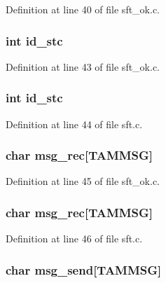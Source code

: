 Definition at line 40 of file sft\_\-ok.c.

\hypertarget{group__tools_gad4a4ca83bbe60e2e30bcb135a16d4ae0}{
\subsubsection[{id\_\-stc}]{\setlength{\rightskip}{0pt plus 5cm}int {\bf id\_\-stc}}}
\label{group__tools_gad4a4ca83bbe60e2e30bcb135a16d4ae0}


Definition at line 43 of file sft\_\-ok.c.

\hypertarget{group__tools_gad4a4ca83bbe60e2e30bcb135a16d4ae0}{
\subsubsection[{id\_\-stc}]{\setlength{\rightskip}{0pt plus 5cm}int {\bf id\_\-stc}}}
\label{group__tools_gad4a4ca83bbe60e2e30bcb135a16d4ae0}


Definition at line 44 of file sft.c.

\hypertarget{group__tools_gaee111dc44c3bce736f7f414e0641a022}{
\subsubsection[{msg\_\-rec}]{\setlength{\rightskip}{0pt plus 5cm}char {\bf msg\_\-rec}\mbox{[}TAMMSG\mbox{]}}}
\label{group__tools_gaee111dc44c3bce736f7f414e0641a022}


Definition at line 45 of file sft\_\-ok.c.

\hypertarget{group__tools_gaee111dc44c3bce736f7f414e0641a022}{
\subsubsection[{msg\_\-rec}]{\setlength{\rightskip}{0pt plus 5cm}char {\bf msg\_\-rec}\mbox{[}TAMMSG\mbox{]}}}
\label{group__tools_gaee111dc44c3bce736f7f414e0641a022}


Definition at line 46 of file sft.c.

\hypertarget{group__tools_gaf535bd429e84ab4b380e215d1fda88c9}{
\subsubsection[{msg\_\-send}]{\setlength{\rightskip}{0pt plus 5cm}char {\bf msg\_\-send}\mbox{[}TAMMSG\mbox{]}}}
\label{group__tools_gaf535bd429e84ab4b380e215d1fda88c9}


